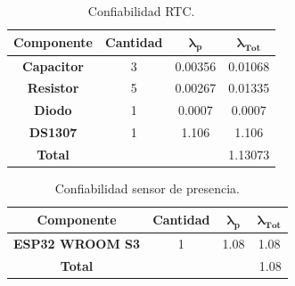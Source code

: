 \begin{table}[H]
\centering
\begin{tabular}{|c|ccc|}
\hline
\textbf{Componente} & \multicolumn{1}{c|}{\textbf{Cantidad}} & \multicolumn{1}{c|}{$\boldsymbol{\lambda_p}$}        & $\boldsymbol{\lambda_{Tot}}$ \\ \hline
\textbf{Capacitor}  & \multicolumn{1}{c|}{3}                 & \multicolumn{1}{c|}{\cellcolor[HTML]{FFFFFF}0.00356} & 0.01068                      \\ \hline
\textbf{Resistor}   & \multicolumn{1}{c|}{5}                 & \multicolumn{1}{c|}{\cellcolor[HTML]{FFFFFF}0.00267} & 0.01335                      \\ \hline
\textbf{Diodo}      & \multicolumn{1}{c|}{1}                 & \multicolumn{1}{c|}{\cellcolor[HTML]{FFFFFF}0.0007}  & 0.0007                       \\ \hline
\textbf{DS1307}     & \multicolumn{1}{c|}{1}                 & \multicolumn{1}{c|}{1.106}                           & 1.106                        \\ \hline
\textbf{Total}      & \multicolumn{1}{l}{}                   & \multicolumn{1}{l}{}                                 & \multicolumn{1}{r|}{1.13073} \\ \hline
\end{tabular}
\caption{Confiabilidad RTC.}
\label{confRTC}
\end{table}
\begin{table}[H]
\centering
\begin{tabular}{|c|ccc|}
\hline
\textbf{Componente}     & \multicolumn{1}{c|}{\textbf{Cantidad}} & \multicolumn{1}{c|}{$\boldsymbol{\lambda_p}$}     & $\boldsymbol{\lambda_{Tot}}$ \\ \hline
\textbf{ESP32 WROOM S3} & \multicolumn{1}{c|}{1}                 & \multicolumn{1}{c|}{\cellcolor[HTML]{FFFFFF}1.08} & 1.08                         \\ \hline
\textbf{Total}          & \multicolumn{1}{l}{}                   & \multicolumn{1}{l}{\cellcolor[HTML]{FFFFFF}}      & \multicolumn{1}{r|}{1.08}    \\ \hline
\end{tabular}
\caption{Confiabilidad sensor de presencia.}
\label{tab:confpres}
\end{table}
